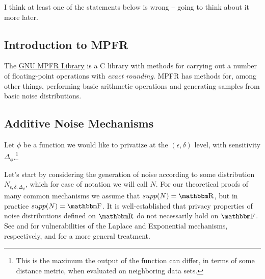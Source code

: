 \documentclass[11pt]{scrartcl} %
\begin{document}
\begin{tcolorbox}[colback = {green}, title = {Disclaimer}, colbacktitle = black]
	I think at least one of the statements below is wrong -- going to think about it more later. 
\end{tcolorbox}

\subsection{Introduction to MPFR}
The \href{https://www.mpfr.org/}{GNU MPFR Library}\cite{FHL+07} is a C library with methods for carrying out a number
of floating-point operations with \emph{exact rounding}.
MPFR has methods for, among other things, performing basic arithmetic operations and generating samples
from basic noise distributions.

\subsection{Additive Noise Mechanisms}
Let $\phi$ be a function we would like to privatize at the $(\epsilon, \delta)$ level,
with sensitivity $\Delta_{\phi}$.\footnote{This is the maximum the output of
the function can differ, in terms of some distance metric, when evaluated on neighboring data sets.} \newline

Let's start by considering the generation of noise according to some distribution $N_{\epsilon, \delta, \Delta_{\phi}}$,
which for ease of notation we will call $N$.
For our theoretical proofs of many common mechanisms we assume that $supp(N) = \R$,
but in practice $supp(N) = \F$. It is well-established that privacy properties
of noise distributions defined on $\R$ do not necessarily hold on $\F$.
See \cite{Mir12} and \cite{Ilv19} for vulnerabilities of the Laplace and Exponential
mechanisms, respectively, and \cite{GMP16} for a more general treatment. \newline
\end{document}
